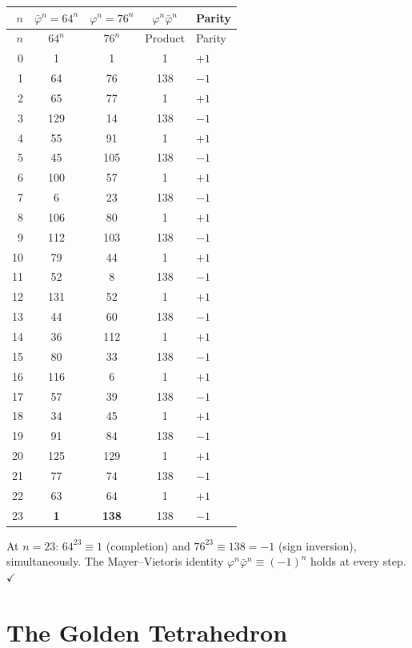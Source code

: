 \begin{center}
\begin{longtable}{@{}rcccl@{}}
\toprule
$n$ & $\bar\varphi^n = 64^n$ & $\varphi^n = 76^n$ &
$\varphi^n \bar\varphi^n$ & Parity \\
\midrule
\endfirsthead
\toprule
$n$ & $64^n$ & $76^n$ & Product & Parity \\
\midrule
\endhead
0 & 1 & 1 & 1 & $+1$ \\
1 & 64 & 76 & 138 & $-1$ \\
2 & 65 & 77 & 1 & $+1$ \\
3 & 129 & 14 & 138 & $-1$ \\
4 & 55 & 91 & 1 & $+1$ \\
5 & 45 & 105 & 138 & $-1$ \\
6 & 100 & 57 & 1 & $+1$ \\
7 & 6 & 23 & 138 & $-1$ \\
8 & 106 & 80 & 1 & $+1$ \\
9 & 112 & 103 & 138 & $-1$ \\
10 & 79 & 44 & 1 & $+1$ \\
11 & 52 & 8 & 138 & $-1$ \\
12 & 131 & 52 & 1 & $+1$ \\
13 & 44 & 60 & 138 & $-1$ \\
14 & 36 & 112 & 1 & $+1$ \\
15 & 80 & 33 & 138 & $-1$ \\
16 & 116 & 6 & 1 & $+1$ \\
17 & 57 & 39 & 138 & $-1$ \\
18 & 34 & 45 & 1 & $+1$ \\
19 & 91 & 84 & 138 & $-1$ \\
20 & 125 & 129 & 1 & $+1$ \\
21 & 77 & 74 & 138 & $-1$ \\
22 & 63 & 64 & 1 & $+1$ \\
\midrule
23 & \textbf{1} & \textbf{138} & 138 & $-1$ \\
\bottomrule
\end{longtable}
\end{center}

At $n = 23$: $64^{23} \equiv 1$ (completion) and $76^{23} \equiv 138 = -1$
(sign inversion), simultaneously. The Mayer--Vietoris identity
$\varphi^n \bar\varphi^n \equiv (-1)^n$ holds at every step. $\checkmark$

\section{The Golden Tetrahedron}
\label{sec:tetrahedron}

